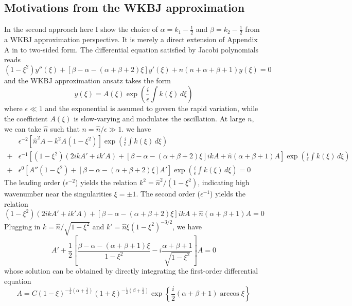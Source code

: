 \subsection{Motivations from the WKBJ approximation}

In the second approach here I show the choice of $\alpha = k_1 - \frac{1}{2}$ and $\beta = k_2 - \frac{1}{2}$ from a WKBJ approximation perspective.
It is merely a direct extension of Appendix A in \citet{livermore_spectral_2007} to two-sided form.
The differential equation satisfied by Jacobi polynomials reads
%
\[
    (1 - \xi^2) y''(\xi) + [\beta - \alpha - (\alpha + \beta + 2)\xi] y'(\xi) + n(n + \alpha + \beta + 1) y(\xi) = 0
\]
%
and the WKBJ approximation ansatz takes the form
%
\[
    y(\xi) = A(\xi) \exp\left(\frac{i}{\epsilon} \int k(\xi) \, d\xi\right)
\]
%
where $\epsilon \ll 1$ and the exponential is assumed to govern the rapid variation, while the coefficient $A(\xi)$ is slow-varying and modulates the oscillation. At large $n$, we can take $\hat{n}$ such that $n = \hat{n}/\epsilon \gg 1$. we have 
%
\[\begin{aligned}
    &\epsilon^{-2} \left[\hat{n}^2 A - k^2 A (1 - \xi^2)\right] \exp\left(\frac{i}{\epsilon} \int k(\xi) \, d\xi\right) \\ 
    + &\epsilon^{-1} \left[(1 - \xi^2)(2ikA' + ik'A) + [\beta - \alpha - (\alpha + \beta + 2)\xi]ikA + \hat{n} (\alpha + \beta + 1) A \right] \exp\left(\frac{i}{\epsilon} \int k(\xi) \, d\xi\right) \\ 
    + &\epsilon^0 \left[A'' (1 - \xi^2) + [\beta - \alpha - (\alpha + \beta + 2)\xi] A' \right] \exp\left(\frac{i}{\epsilon} \int k(\xi) \, d\xi\right) = 0
\end{aligned}\]
%
The leading order ($\epsilon^{-2}$) yields the relation $k^2 = \hat{n}^2/(1 - \xi^2)$, indicating high wavenumber near the singularities $\xi = \pm 1$. The second order ($\epsilon^{-1}$) yields the relation
%
\[
    (1 - \xi^2)(2ikA' + ik'A) + [\beta - \alpha - (\alpha + \beta + 2)\xi]ikA + \hat{n} (\alpha + \beta + 1) A = 0
\]
%
Plugging in $k = \hat{n}/\sqrt{1 - \xi^2}$ and $k' = \hat{n} \xi (1 - \xi^2)^{-3/2}$, we have
%
\begin{equation}
    A' + \frac{1}{2} \left[\frac{\beta - \alpha - (\alpha + \beta + 1)\xi}{1 - \xi^2} - i \frac{\alpha + \beta + 1}{\sqrt{1 - \xi^2}}\right] A = 0
\end{equation}
%
whose solution can be obtained by directly integrating the first-order differential equation
%
\begin{equation}
    A = C (1 - \xi)^{-\frac{1}{2}(\alpha + \frac{1}{2})} (1 + \xi)^{-\frac{1}{2}(\beta + \frac{1}{2})} \exp\left\{\frac{i}{2}(\alpha + \beta + 1) \arccos\xi\right\}
\end{equation}
